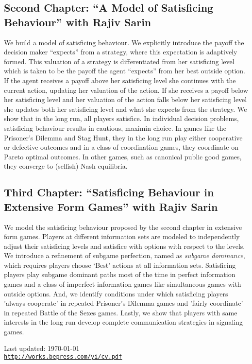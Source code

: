 \documentclass[letterpaper,11pt]{article}
\def\footerlink{http://works.bepress.com/yi/cv.pdf}
\renewenvironment{itemize}{
\begin{list}{}{
\setlength{\leftmargin}{1.5em}
}
}{
\end{list}
}
\begin{document}
\vspace{-.3in}

\subsection*{Second Chapter: ``A Model of Satisficing Behaviour'' with Rajiv Sarin}
\begin{itemize}
\item \begin{spacing}{1.0} We build a model of satisficing behaviour. We explicitly introduce the
payoff the decision maker ``expects'' from a strategy, where this expectation is adaptively formed. This valuation of a strategy is differentiated from her satisficing level which is taken to be the payoff the agent ``expects'' from her best outside option. If the agent receives a payoff above her satisficing level she continues with the current action, updating her valuation of the action. If she receives a payoff below her satisficing level and her valuation of the action falls below her satisficing level she updates both her satisficing level and what she expects from the strategy. We show that in the long run, all players satisfice. In individual decision problems, satisficing behaviour results in cautious, maximin choice. In games like the Prisoner's Dilemma and Stag Hunt, they in the long run play either cooperative or defective outcomes and in a class of coordination games, they coordinate on Pareto optimal outcomes. In other games, such as canonical public good games, they converge to (selfish) Nash equilibria.
\end{spacing}
\end{itemize}

\vspace{-.3in}

\subsection*{Third Chapter: ``Satisficing Behaviour in Extensive Form Games'' with Rajiv Sarin}
\begin{itemize}
\item \begin{spacing}{1.0} We model the satisficing behaviour proposed by the second chapter in extensive form games. Players at different information sets are modeled to independently adjust their satisficing levels and satisfice with options with respect to the levels. We introduce a refinement of subgame perfection, named as \emph{subgame dominance}, which requires players choose `Best' actions at all information sets. Satisficing players play subgame dominant paths most of the time in perfect information games and a class of imperfect information games like simultaneous games with outside options. And, we identify conditions under which satisficing players 'always cooperate' in repeated Prisoner's Dilemma games and 'fairly coordinate' in repeated Battle of the Sexes games. Lastly, we show that players with same interests in the long run develop complete communication strategies in signaling games.
\end{spacing}
\end{itemize}

\vfill

\begin{center}
\begin{footnotesize}
Last updated: \today \\
\href{\footerlink}{\texttt{\footerlink}}
\end{footnotesize}
\end{center}
\end{document}
